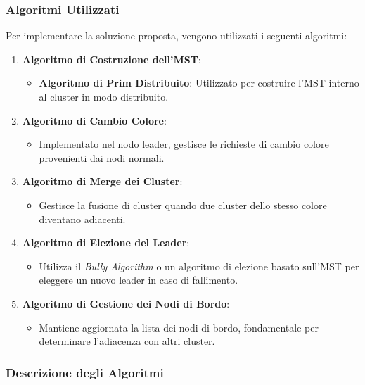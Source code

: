 \documentclass[12pt, a4paper]{report}
\begin{document}
\subsubsection{Algoritmi Utilizzati}

Per implementare la soluzione proposta, vengono utilizzati i seguenti algoritmi:

\begin{enumerate}
    \item \textbf{Algoritmo di Costruzione dell'MST}:
    \begin{itemize}
        \item \textbf{Algoritmo di Prim Distribuito}: Utilizzato per costruire l'MST interno al cluster in modo distribuito.
    \end{itemize}
    \item \textbf{Algoritmo di Cambio Colore}:
    \begin{itemize}
        \item Implementato nel nodo leader, gestisce le richieste di cambio colore provenienti dai nodi normali.
    \end{itemize}
    \item \textbf{Algoritmo di Merge dei Cluster}:
    \begin{itemize}
        \item Gestisce la fusione di cluster quando due cluster dello stesso colore diventano adiacenti.
    \end{itemize}
    \item \textbf{Algoritmo di Elezione del Leader}:
    \begin{itemize}
        \item Utilizza il \emph{Bully Algorithm} o un algoritmo di elezione basato sull'MST per eleggere un nuovo leader in caso di fallimento.
    \end{itemize}
    \item \textbf{Algoritmo di Gestione dei Nodi di Bordo}:
    \begin{itemize}
        \item Mantiene aggiornata la lista dei nodi di bordo, fondamentale per determinare l'adiacenza con altri cluster.
    \end{itemize}
\end{enumerate}

\subsubsection{Descrizione degli Algoritmi}
\end{document}
